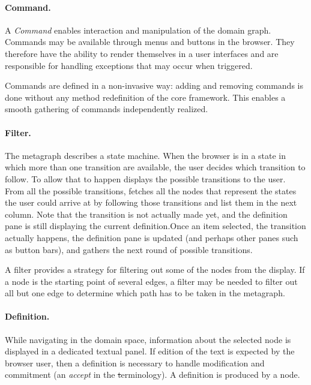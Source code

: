 \documentclass[a4paper,10pt,twoside]{book}
\begin{document}
\paragraph{Command.} A \emph{Command} enables interaction and manipulation of the domain graph. Commands may be available through menus and buttons in the browser. They therefore have the ability to render themselves in a user interfaces and are responsible for handling exceptions that may occur when triggered. 

Commands are defined in a non-invasive way: adding and removing commands is done without any method redefinition of the core framework. This enables a smooth gathering of commands independently realized.

\paragraph{Filter.} 
The metagraph describes a state machine. When the browser is in a state in which more than one transition are available, the user decides which transition to follow. To allow that to happen \ob displays the possible transitions  to the user. From all the possible transitions, \obf fetches all the nodes that represent the states the user could arrive at by following those transitions and list them in the next column. Note that the transition is not actually made yet, and the definition pane is still displaying the current definition.Once an item selected, the transition  actually happens, the definition pane is updated (and perhaps other panes such as button bars), and \ob gathers the next round of possible transitions.


A filter provides a strategy for filtering out some of the nodes from the display. If a node is the starting point of several edges, a filter may be needed to filter out all but one edge to determine which path has to be taken in the metagraph. 

\paragraph{Definition.} While navigating in the domain space, information about the selected node is displayed in a dedicated textual panel. If edition of the text is expected by the browser user, then a definition is necessary to handle modification and commitment (\ie an \emph{accept} in the \st terminology). A definition is produced by a node. 
\end{document}
